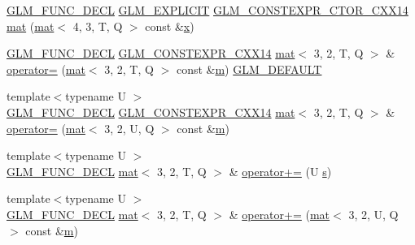 \begin{DoxyCompactItemize}
\item 
\hyperlink{setup_8hpp_ab2d052de21a70539923e9bcbf6e83a51}{G\+L\+M\+\_\+\+F\+U\+N\+C\+\_\+\+D\+E\+CL} \hyperlink{setup_8hpp_a6c74f5a5e7b134ab69023ff9a30d4d5d}{G\+L\+M\+\_\+\+E\+X\+P\+L\+I\+C\+IT} \hyperlink{setup_8hpp_a0900f9145e68bf6061b6f5e7be3fa751}{G\+L\+M\+\_\+\+C\+O\+N\+S\+T\+E\+X\+P\+R\+\_\+\+C\+T\+O\+R\+\_\+\+C\+X\+X14} \hyperlink{structglm_1_1mat_3_013_00_012_00_01_t_00_01_q_01_4_a6609dd1388669f460272cae28a7e3f59}{mat} (\hyperlink{structglm_1_1mat}{mat}$<$ 4, 3, T, Q $>$ const \&\hyperlink{_s_d_l__opengl_8h_ad0e63d0edcdbd3d79554076bf309fd47}{x})
\item 
\hyperlink{setup_8hpp_ab2d052de21a70539923e9bcbf6e83a51}{G\+L\+M\+\_\+\+F\+U\+N\+C\+\_\+\+D\+E\+CL} \hyperlink{setup_8hpp_a4dd12abf5e1164bc57f3a34671d03844}{G\+L\+M\+\_\+\+C\+O\+N\+S\+T\+E\+X\+P\+R\+\_\+\+C\+X\+X14} \hyperlink{structglm_1_1mat}{mat}$<$ 3, 2, T, Q $>$ \& \hyperlink{structglm_1_1mat_3_013_00_012_00_01_t_00_01_q_01_4_a2a09bf01e80931b90c2de9504827c84d}{operator=} (\hyperlink{structglm_1_1mat}{mat}$<$ 3, 2, T, Q $>$ const \&\hyperlink{_s_d_l__opengl__glext_8h_af593500c283bf1a787a6f947f503a5c2}{m}) \hyperlink{setup_8hpp_aefce7051c376a64ba89fa93a9f63bc2c}{G\+L\+M\+\_\+\+D\+E\+F\+A\+U\+LT}
\item 
{\footnotesize template$<$typename U $>$ }\\\hyperlink{setup_8hpp_ab2d052de21a70539923e9bcbf6e83a51}{G\+L\+M\+\_\+\+F\+U\+N\+C\+\_\+\+D\+E\+CL} \hyperlink{setup_8hpp_a4dd12abf5e1164bc57f3a34671d03844}{G\+L\+M\+\_\+\+C\+O\+N\+S\+T\+E\+X\+P\+R\+\_\+\+C\+X\+X14} \hyperlink{structglm_1_1mat}{mat}$<$ 3, 2, T, Q $>$ \& \hyperlink{structglm_1_1mat_3_013_00_012_00_01_t_00_01_q_01_4_a3d6d60a4cc35f5c3c0e3b546450cf4b5}{operator=} (\hyperlink{structglm_1_1mat}{mat}$<$ 3, 2, U, Q $>$ const \&\hyperlink{_s_d_l__opengl__glext_8h_af593500c283bf1a787a6f947f503a5c2}{m})
\item 
{\footnotesize template$<$typename U $>$ }\\\hyperlink{setup_8hpp_ab2d052de21a70539923e9bcbf6e83a51}{G\+L\+M\+\_\+\+F\+U\+N\+C\+\_\+\+D\+E\+CL} \hyperlink{structglm_1_1mat}{mat}$<$ 3, 2, T, Q $>$ \& \hyperlink{structglm_1_1mat_3_013_00_012_00_01_t_00_01_q_01_4_a2f7849a67991389dab2de4945f67f1f9}{operator+=} (U \hyperlink{_s_d_l__opengl_8h_a4af680a6c683f88ed67b76f207f2e6e4}{s})
\item 
{\footnotesize template$<$typename U $>$ }\\\hyperlink{setup_8hpp_ab2d052de21a70539923e9bcbf6e83a51}{G\+L\+M\+\_\+\+F\+U\+N\+C\+\_\+\+D\+E\+CL} \hyperlink{structglm_1_1mat}{mat}$<$ 3, 2, T, Q $>$ \& \hyperlink{structglm_1_1mat_3_013_00_012_00_01_t_00_01_q_01_4_abf135c2584e5a5fcdaff6488d353d0fe}{operator+=} (\hyperlink{structglm_1_1mat}{mat}$<$ 3, 2, U, Q $>$ const \&\hyperlink{_s_d_l__opengl__glext_8h_af593500c283bf1a787a6f947f503a5c2}{m})

\end{DoxyCompactItemize}
